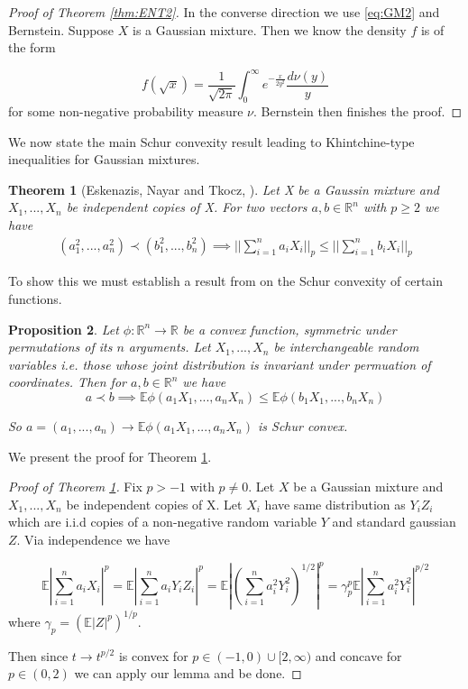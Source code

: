 \documentclass[10pt]{article}
\newcommand{\E}{\mathbb{E}}
\newcommand{\1}{\textbf{1}}
\newcommand{\R}{\mathbb{R}}
\newtheorem{theorem}{Theorem}[subsection]
\newtheorem{prop}[theorem]{Proposition}
\theoremstyle{remark}
\theoremstyle{definition}
\begin{document}
\begin{proof}[Proof of Theorem \ref{thm:ENT2}]
In the converse direction we use \ref{eq:GM2} and Bernstein. Suppose $X$ is a Gaussian mixture. Then we know the density $f$ is of the form

\begin{equation*}
	f(\sqrt{x}) = \frac{1}{\sqrt{2\pi}} \int_0^{\infty} e^{-\frac{x}{2y^2}} \frac{d\nu(y)}{y}
\end{equation*} for some non-negative probability measure $\nu$. Bernstein then finishes the proof.
\end{proof}


We now state the main Schur convexity result leading to Khintchine-type inequalities for Gaussian mixtures.

\begin{theorem}[Eskenazis, Nayar and Tkocz, \cite{ENT}]\label{thm:ENT3}
	Let X be a Gaussin mixture and $X_1,...,X_n$ be independent copies of X. For two vectors $a,b \in \R^n$ with $p \geq 2$ we have
	\begin{align*}
		(a_1^2,...,a_n^2) \prec (b_1^2,...,b_n^2) \implies ||\sum_{i=1}^n a_iX_i||_p \leq ||\sum_{i=1}^n b_iX_i||_p
	\end{align*}
\end{theorem}

To show this we must establish a result from on the Schur convexity of certain functions. 


\begin{prop}
	Let $\phi: \R^n \to \R$ be a convex function, symmetric under permutations of its $n$ arguments. Let $X_1,...,X_n$ be interchangeable random variables i.e. those whose joint distribution is invariant under permuation of coordinates. Then for $a,b \in \R^n$ we have
	\begin{equation}
		a \prec b \implies \E\phi(a_1X_1,...,a_nX_n) \leq \E \phi(b_1X_1,...,b_nX_n)
	\end{equation}

	So $a=(a_1,...,a_n) \to \E \phi(a_1X_1,...,a_nX_n)$ is Schur convex.
\end{prop} We present the proof for Theorem \ref{thm:ENT3}. 

\begin{proof}[Proof of Theorem \ref{thm:ENT3}]

Fix $p > -1$ with $p \neq 0$. Let $X$ be a Gaussian mixture and $X_1,...,X_n$ be independent copies of X. Let $X_i$ have same distribution as $Y_iZ_i$ which are i.i.d copies of a non-negative random variable $Y$ and standard gaussian $Z$. Via independence we have

\begin{equation*}
	\E|\sum_{i=1}^n a_iX_i|^p = \E|\sum_{i=1}^n a_i Y_i Z_i|^p = \E|(\sum_{i=1}^na_i^2Y_i^2)^{1/2}|^p = \gamma_p^p \E|\sum_{i=1}^n a_i^2Y_i^2|^{p/2}
\end{equation*}  where $\gamma_p = (\E|Z|^p)^{1/p}$. 

Then since $t \to t^{p/2}$ is convex for $p \in (-1,0) \cup [2,\infty)$ and concave for $p \in (0,2)$ we can apply our lemma and be done.

\end{proof}
\end{document}
